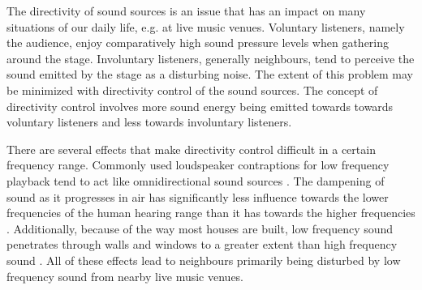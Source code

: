 
The directivity of sound sources is an issue that has an impact on many situations of our daily life, e.g. at live music venues. Voluntary listeners, namely the audience, enjoy comparatively high sound pressure levels when gathering around the stage. Involuntary listeners, generally neighbours, tend to perceive the sound emitted by the stage as a disturbing noise. The extent of this problem may be minimized with directivity control of the sound sources. The concept of directivity control involves more sound energy being emitted towards towards voluntary listeners and less towards involuntary listeners. 

There are several effects that make directivity control difficult in a certain frequency range. Commonly used loudspeaker contraptions for low frequency playback tend to act like omnidirectional sound sources \citep[p. 1391 f.]{crocker98}.  The dampening of sound as it progresses in air has significantly less influence towards the lower frequencies of the human hearing range than it has towards the higher frequencies \citep[p. 240]{moeser2009}. Additionally, because of the way most houses are built, low frequency sound penetrates through walls and windows to a greater extent than high frequency sound \citep[p. 240 ff.]{moeser2009}. All of these effects lead to neighbours primarily being disturbed by low frequency sound from nearby live music venues.\\

